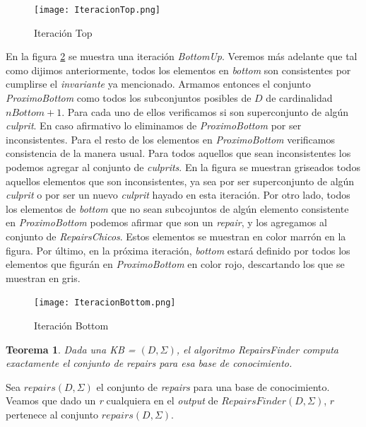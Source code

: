 \documentclass[11pt,a4paper,twoside]{tesis}
\begin{document}
\begin{figure}[ht]
    \texttt{[image: IteracionTop.png]}
    \centering
    \caption{Iteración Top}
    \label{fig:iteracion_top}
\end{figure}

En la figura \ref{fig:iteracion_bottom} se muestra una iteración \textit{BottomUp}. Veremos más adelante que tal como dijimos anteriormente, todos los elementos en \textit{bottom} son consistentes por cumplirse el \textit{invariante} ya mencionado. Armamos entonces el conjunto \textit{ProximoBottom} como todos los subconjuntos posibles de $D$ de cardinalidad $nBottom + 1$. Para cada uno de ellos verificamos si son superconjunto de algún \textit{culprit}. En caso afirmativo lo eliminamos de \textit{ProximoBottom} por ser inconsistentes. Para el resto de los elementos en \textit{ProximoBottom} verificamos consistencia de la manera usual. Para todos aquellos que sean inconsistentes los podemos agregar al conjunto de \textit{culprits}. En la figura se muestran griseados todos aquellos elementos que son inconsistentes, ya sea por ser superconjunto de algún \textit{culprit} o por ser un nuevo \textit{culprit} hayado en esta iteración.
Por otro lado, todos los elementos de \textit{bottom} que no sean subcojuntos de algún elemento consistente en \textit{ProximoBottom} podemos afirmar que son un \textit{repair}, y los agregamos al conjunto de \textit{RepairsChicos}. Estos elementos se muestran en color marrón en la figura. Por último, en la próxima iteración, \textit{bottom} estará definido por todos los elementos que figurán en \textit{ProximoBottom} en color rojo, descartando los que se muestran en gris.


\begin{figure}[ht]
    \texttt{[image: IteracionBottom.png]}
    \centering
    \caption{Iteración Bottom}
    \label{fig:iteracion_bottom}
\end{figure}


\newtheorem{theorem}{Teorema} 
\newtheorem{lemma}[theorem]{Lema}

\begin{theorem}
Dada una \textit{KB} = $(D, \Sigma)$, el algoritmo \textit{RepairsFinder} computa exactamente el conjunto de \textit{repairs} para esa base de conocimiento.
\end{theorem}

Sea $repairs(D, \Sigma)$ el conjunto de \textit{repairs} para una base de conocimiento. Veamos que dado un \textit{r} cualquiera en el \textit{output} de $RepairsFinder(D, \Sigma)$, $r$ pertenece al conjunto $repairs(D, \Sigma)$.
\end{document}

